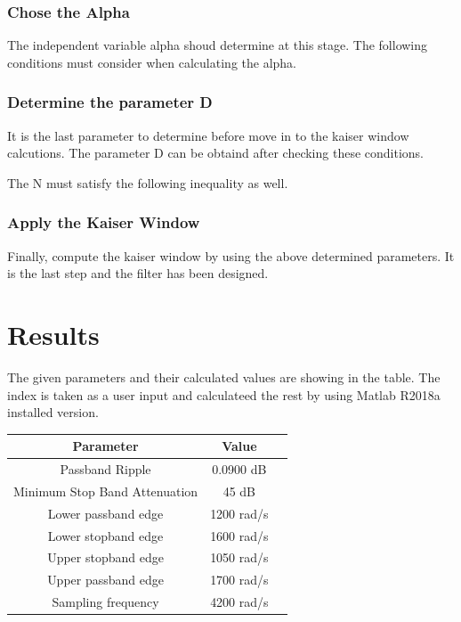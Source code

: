 \documentclass[twoside,12pt,times,onecolumn,a4paper]{report}
\begin{document}
\subsection{Chose the Alpha}

\hspace{4em}The independent variable alpha shoud determine at this stage. The following conditions must consider when calculating the alpha.


\subsection{Determine the parameter D}
\hspace{4em}It is the last parameter to determine before move in to the kaiser window calcutions. The parameter D can be obtaind after checking these conditions. 


The N must satisfy the following inequality as well. 


\subsection{Apply the Kaiser Window}

\hspace{4em}Finally, compute the kaiser window by using the above determined parameters. It is the last step and the filter has been designed.



\chapter{Results}
\hspace{4em}The given parameters and their calculated values are showing in the table. The index is taken as a user input and calculateed the rest by using Matlab R2018a installed version. 
\begin{center}
\begin{tabular}{ |c|c|c| } 
\hline
Parameter & Value \\
\hline
Passband Ripple & 0.0900 dB \\ 
Minimum Stop Band Attenuation & 45 dB\\ 
Lower passband edge & 1200 rad/s \\ 
Lower stopband edge & 1600 rad/s \\ 
Upper stopband edge & 1050 rad/s \\ 
Upper passband edge & 1700 rad/s \\ 
Sampling frequency & 4200 rad/s \\ 
\hline
\end{tabular}
\end{center}
\end{document}

